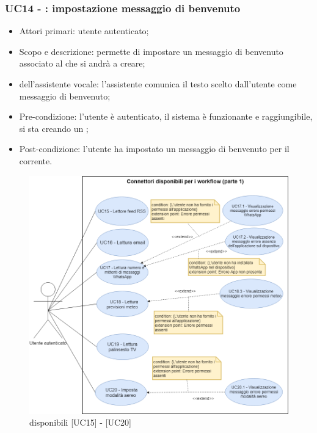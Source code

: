 \subsubsection{UC14 - : impostazione messaggio di benvenuto}
\begin{itemize}
	\item  Attori primari: utente autenticato;
	\item  Scopo e descrizione: permette di impostare un messaggio di benvenuto associato al  che si andrà a creare;
	\item  {} dell'assistente vocale: l'assistente comunica il testo scelto dall'utente come messaggio di benvenuto;
	\item  Pre-condizione: l'utente è autenticato, il sistema è funzionante e raggiungibile, si sta creando un ;
	\item  Post-condizione: l'utente ha impostato un messaggio di benvenuto per il  corrente.
\end{itemize}
\begin{figure}[H]
	\centering
	\includegraphics[width=15cm,keepaspectratio]{../includes/pics/wf1.png}
	\caption{\label{fig:mission} disponibili [UC15] - [UC20]}
\end{figure}

